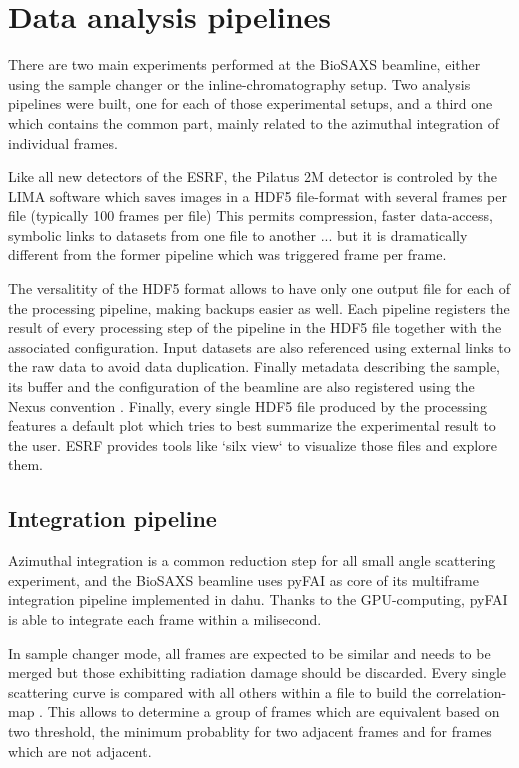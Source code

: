 \documentclass[preprint]{iucr}              %
\begin{document}
\section{Data analysis pipelines}

There are two main experiments performed at the BioSAXS beamline, either using the sample changer or the inline-chromatography setup.
Two analysis pipelines were built, one for each of those experimental setups, and a third one which contains the common part, mainly related to
the azimuthal integration of individual frames.

Like all new detectors of the ESRF, the Pilatus 2M detector is controled by the LIMA \cite{lima} software which saves images in a HDF5 file-format \cite{hdf5} with several frames per file (typically 100 frames per file)
This permits compression, faster data-access, symbolic links to datasets from one file to another ... but it is dramatically different from the former pipeline which was triggered frame per frame.

The versalitity of the HDF5 format allows to have only one output file for each of the processing pipeline, making backups easier as well. 
Each pipeline registers the result of every processing step of the pipeline in the HDF5 file together with the associated configuration.
Input datasets are also referenced using external links to the raw data to avoid data duplication. 
Finally metadata describing the sample, its buffer and the configuration of the beamline are also registered using the Nexus convention \cite{nexus}.
Finally, every single HDF5 file produced by the processing features a default plot which tries to best summarize the experimental result to the user.
ESRF provides tools like `silx view` to visualize those files and explore them.

\subsection{Integration pipeline}

Azimuthal integration is a common reduction step for all small angle scattering experiment, and the BioSAXS beamline uses
pyFAI \cite{pyFAI2020} as core of its multiframe integration pipeline implemented in dahu.
Thanks to the GPU-computing, pyFAI is able to integrate each frame within a milisecond.

In sample changer mode, all frames are expected to be similar and needs to be merged but those exhibitting radiation damage should be discarded.
Every single scattering curve is compared with all others within a file to build the correlation-map \cite{cormap}. 
This allows to determine a group of frames which are equivalent based on two threshold, the minimum probablity for two adjacent frames 
and for frames which are not adjacent. 
\end{document}
